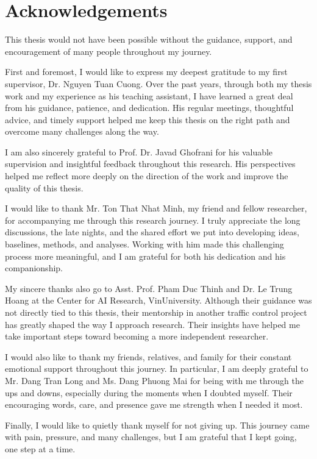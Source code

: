 \chapter*{Acknowledgements}
\label{ch:Acknowledgements}

This thesis would not have been possible without the guidance, support, and encouragement of many people throughout my journey.

First and foremost, I would like to express my deepest gratitude to my first supervisor, Dr. Nguyen Tuan Cuong. Over the past years, through both my thesis work and my experience as his teaching assistant, I have learned a great deal from his guidance, patience, and dedication. His regular meetings, thoughtful advice, and timely support helped me keep this thesis on the right path and overcome many challenges along the way.

I am also sincerely grateful to Prof. Dr. Javad Ghofrani for his valuable supervision and insightful feedback throughout this research. His perspectives helped me reflect more deeply on the direction of the work and improve the quality of this thesis.

I would like to thank Mr. Ton That Nhat Minh, my friend and fellow researcher, for accompanying me through this research journey. I truly appreciate the long discussions, the late nights, and the shared effort we put into developing ideas, baselines, methods, and analyses. Working with him made this challenging process more meaningful, and I am grateful for both his dedication and his companionship.

My sincere thanks also go to Asst. Prof. Pham Duc Thinh and Dr. Le Trung Hoang at the Center for AI Research, VinUniversity. Although their guidance was not directly tied to this thesis, their mentorship in another traffic control project has greatly shaped the way I approach research. Their insights have helped me take important steps toward becoming a more independent researcher.

I would also like to thank my friends, relatives, and family for their constant emotional support throughout this journey. In particular, I am deeply grateful to Mr. Dang Tran Long and Ms. Dang Phuong Mai for being with me through the ups and downs, especially during the moments when I doubted myself. Their encouraging words, care, and presence gave me strength when I needed it most.

Finally, I would like to quietly thank myself for not giving up. This journey came with pain, pressure, and many challenges, but I am grateful that I kept going, one step at a time.

